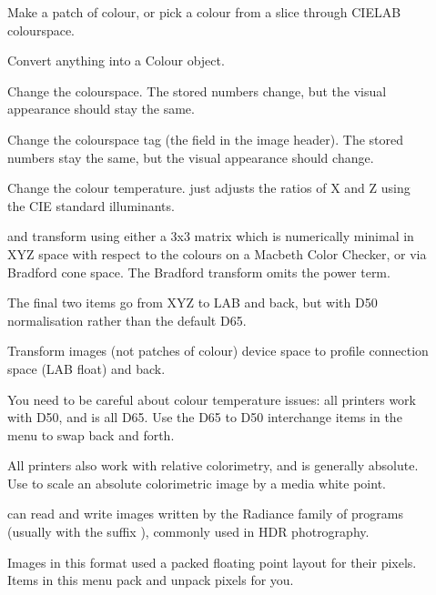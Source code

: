 \begin{description}

\item[]
	Make a patch of colour, or pick a colour from a slice through CIELAB
	colourspace.

\item[]
	Convert anything into a Colour object.

\item[]
	Change the colourspace. The stored numbers change, but the
	visual appearance should stay the same.

\item[]
	Change the colourspace tag (the  field in the image
	header). The stored numbers stay the same, but the visual appearance
	should change.

\item[]
	Change the colour temperature.  just adjusts the
	ratios of X and Z using the CIE standard illuminants.
	
	 and  transform using either a 3x3
	matrix which is numerically minimal in XYZ space with respect to the
	colours on a Macbeth Color Checker, or via Bradford cone space. The
	Bradford transform omits the power term.

	The final two items go from XYZ to LAB and back, but with D50
	normalisation rather than the default D65.

\item[]
	Transform images (not patches of colour) device space to profile 
	connection space (LAB float) and back. 
	
	You need to be careful about colour temperature issues:
	all printers work with D50, and \nip{} is all D65. Use the D65 to D50
	interchange items in the  menu to swap back and
	forth.

	All printers also work with relative colorimetry, and \nip{} is
	generally absolute. Use  to scale an absolute
	colorimetric image by a media white point.

\item[]
	\nip{} can read and write images written by the Radiance family
	of programs (usually with the suffix ), commonly used in
	HDR photrography.

	Images in this format used a packed floating point layout for their
	pixels. Items in this menu pack and unpack pixels for you.


\end{description}
